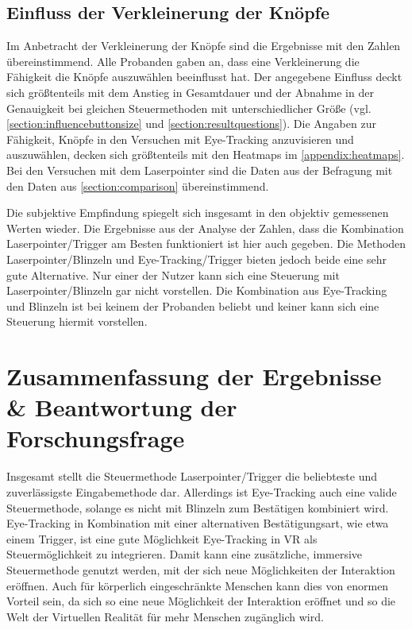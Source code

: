 \subsection{Einfluss der Verkleinerung der Knöpfe}
Im Anbetracht der Verkleinerung der Knöpfe sind die Ergebnisse mit den Zahlen übereinstimmend. Alle Probanden gaben an, dass eine Verkleinerung die Fähigkeit die Knöpfe auszuwählen beeinflusst hat. Der angegebene Einfluss deckt sich größtenteils mit dem Anstieg in Gesamtdauer und der Abnahme in der Genauigkeit bei gleichen Steuermethoden mit unterschiedlicher Größe (vgl. \autoref{section:influencebuttonsize} und \autoref{section:resultquestions}). Die Angaben zur Fähigkeit, Knöpfe in den Versuchen mit Eye-Tracking anzuvisieren und auszuwählen, decken sich größtenteils mit den Heatmaps im \autoref{appendix:heatmaps}. Bei den Versuchen mit dem Laserpointer sind die Daten aus der Befragung mit den Daten aus \autoref{section:comparison} übereinstimmend. 

Die subjektive Empfindung spiegelt sich insgesamt in den objektiv gemessenen Werten wieder. Die Ergebnisse aus der Analyse der Zahlen, dass die Kombination Laserpointer/Trigger am Besten funktioniert ist hier auch gegeben. Die Methoden Laserpointer/Blinzeln und Eye-Tracking/Trigger bieten jedoch beide eine sehr gute Alternative. Nur einer der Nutzer kann sich eine Steuerung mit Laserpointer/Blinzeln gar nicht vorstellen. Die Kombination aus Eye-Tracking und Blinzeln ist bei keinem der Probanden beliebt und keiner kann sich eine Steuerung hiermit vorstellen.

\section{Zusammenfassung der Ergebnisse \& Beantwortung der Forschungsfrage}
Insgesamt stellt die Steuermethode Laserpointer/Trigger die beliebteste und zuverlässigste Eingabemethode dar. Allerdings ist Eye-Tracking auch eine valide Steuermethode, solange es nicht mit Blinzeln zum Bestätigen kombiniert wird. Eye-Tracking in Kombination mit einer alternativen Bestätigungsart, wie etwa einem Trigger, ist eine gute Möglichkeit Eye-Tracking in \ac{VR} als Steuermöglichkeit zu integrieren. Damit kann eine zusätzliche, immersive Steuermethode genutzt werden, mit der sich neue Möglichkeiten der Interaktion eröffnen. Auch für körperlich eingeschränkte Menschen kann dies von enormen Vorteil sein, da sich so eine neue Möglichkeit der Interaktion eröffnet und so die Welt der Virtuellen Realität für mehr Menschen zugänglich wird.

